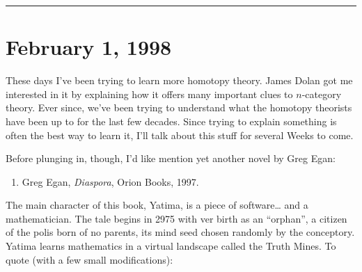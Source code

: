 \documentclass{article}
\def\tightlist{}
\begin{document}
\begin{center}\rule{0.5\linewidth}{0.5pt}\end{center}
\hypertarget{week115}{%
\section{February 1, 1998}\label{week115}}

These days I've been trying to learn more homotopy theory. James Dolan
got me interested in it by explaining how it offers many important clues
to \(n\)-category theory. Ever since, we've been trying to understand
what the homotopy theorists have been up to for the last few decades.
Since trying to explain something is often the best way to learn it,
I'll talk about this stuff for several Weeks to come.

Before plunging in, though, I'd like mention yet another novel by Greg
Egan:

\begin{enumerate}
\def\labelenumi{\arabic{enumi})}
\tightlist
\item
  Greg Egan, \emph{Diaspora}, Orion Books, 1997.
\end{enumerate}

The main character of this book, Yatima, is a piece of software\ldots{}
and a mathematician. The tale begins in 2975 with ver birth as an
``orphan'', a citizen of the polis born of no parents, its mind seed
chosen randomly by the conceptory. Yatima learns mathematics in a
virtual landscape called the Truth Mines. To quote (with a few small
modifications):
\end{document}
